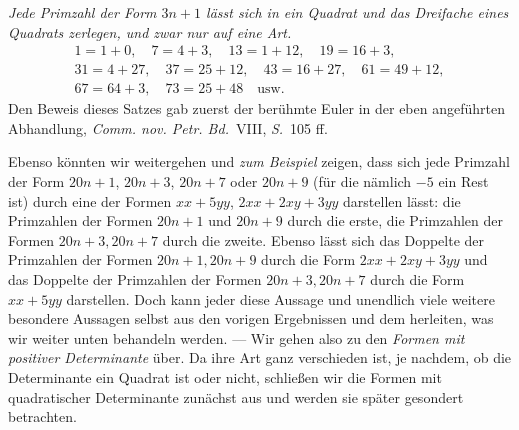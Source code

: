 \textit{Jede Primzahl der Form $3n+1$ lässt sich in ein Quadrat und das Dreifache eines Quadrats zerlegen, und zwar nur auf eine Art.}
\[
\begin{gathered}
1=1+0,\quad7=4+3,\quad13=1+12,\quad19=16+3,\\
31=4+27,\quad37=25+12,\quad43=16+27,\quad61=49+12,\\
67=64+3,\quad73=25+48\quad\text{usw.}
\end{gathered}
\]
Den Beweis dieses Satzes gab zuerst der berühmte Euler in der eben angeführten Abhandlung, \textit{Comm. nov. Petr. Bd.}\ VIII, \textit{S.}\ 105 ff.

Ebenso könnten wir weitergehen und \textit{zum Beispiel} zeigen, dass sich jede Primzahl der Form $20n+1$, $20n+3$, $20n+7$ oder $20n+9$ (für die nämlich $-5$ ein Rest ist) durch eine der Formen $xx+5yy$, $2xx+2xy+3yy$ darstellen lässt: die Primzahlen der Formen $20n+1$ und $20n+9$ durch die erste, die Primzahlen der Formen $20n+3,20n+7$ durch die zweite. Ebenso lässt sich das Doppelte der Primzahlen der Formen $20n+1,20n+9$ durch die Form $2xx+2xy+3yy$ und das Doppelte der Primzahlen der Formen $20n+3,20n+7$ durch die Form $xx+5yy$ darstellen. Doch kann jeder diese Aussage und unendlich viele weitere besondere Aussagen selbst aus den vorigen Ergebnissen und dem herleiten, was wir weiter unten
behandeln werden. --- Wir gehen also zu den \textit{Formen mit positiver Determinante} über. Da ihre Art ganz verschieden ist, je nachdem, ob die Determinante ein Quadrat ist oder nicht, schließen wir die Formen mit quadratischer Determinante zunächst aus und werden sie später gesondert betrachten.
